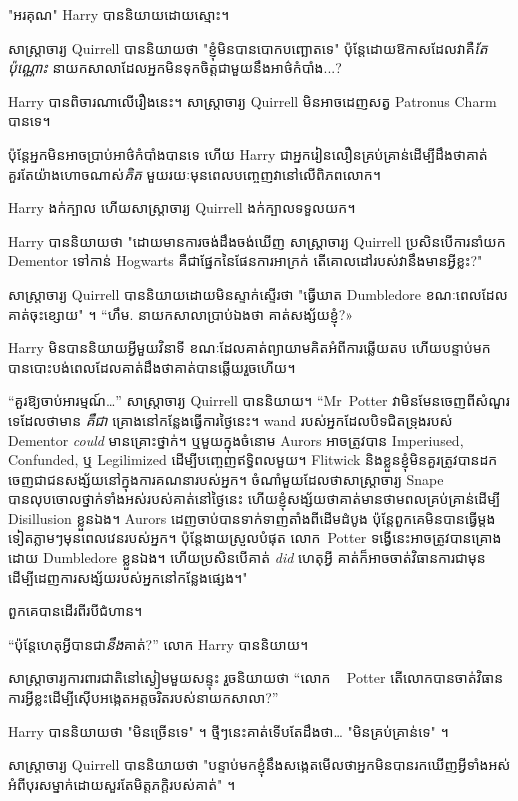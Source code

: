{"អរគុណ" Harry បាននិយាយដោយស្មោះ។

សាស្រ្តាចារ្យ Quirrell បាននិយាយថា "ខ្ញុំមិនបានបោកបញ្ឆោតទេ" ប៉ុន្តែដោយឱកាសដែលវាគឺ\emph{តែប៉ុណ្ណោះ} នាយកសាលាដែលអ្នកមិនទុកចិត្តជាមួយនឹងអាថ៌កំបាំង...?

Harry បានពិចារណាលើរឿងនេះ។ សាស្រ្តាចារ្យ Quirrell មិនអាចដេញសត្វ Patronus Charm បានទេ។

ប៉ុន្តែអ្នកមិនអាចប្រាប់អាថ៌កំបាំងបានទេ ហើយ Harry ជាអ្នករៀនលឿនគ្រប់គ្រាន់ដើម្បីដឹងថាគាត់គួរតែយ៉ាងហោចណាស់\emph{គិត} មួយរយៈមុនពេលបញ្ចេញវានៅលើពិភពលោក។

Harry ងក់ក្បាល ហើយសាស្រ្តាចារ្យ Quirrell ងក់ក្បាលទទួលយក។

Harry បាននិយាយថា "ដោយមានការចង់ដឹងចង់ឃើញ សាស្រ្តាចារ្យ Quirrell ប្រសិនបើការនាំយក Dementor ទៅកាន់ Hogwarts គឺជាផ្នែកនៃផែនការអាក្រក់ តើគោលដៅរបស់វានឹងមានអ្វីខ្លះ?"

សាស្ត្រាចារ្យ Quirrell បាននិយាយដោយមិនស្ទាក់ស្ទើរថា "ធ្វើឃាត Dumbledore ខណៈពេលដែលគាត់ចុះខ្សោយ" ។ “ហឹម. នាយក​សាលា​ប្រាប់​ឯង​ថា គាត់​សង្ស័យ​ខ្ញុំ?»

Harry មិន​បាន​និយាយ​អ្វី​មួយ​វិនាទី ខណៈ​ដែល​គាត់​ព្យាយាម​គិត​អំពី​ការ​ឆ្លើយតប ហើយ​បន្ទាប់​មក​បាន​បោះបង់​ពេល​ដែល​គាត់​ដឹង​ថា​គាត់​បាន​ឆ្លើយ​រួច​ហើយ។

“គួរឱ្យចាប់អារម្មណ៍…” សាស្ត្រាចារ្យ Quirrell បាននិយាយ។ “Mr~Potter វាមិនមែនចេញពីសំណួរទេដែលថាមាន \emph{គឺជា} គ្រោងនៅកន្លែងធ្វើការថ្ងៃនេះ។ wand របស់អ្នកដែលបិទជិតទ្រុងរបស់ Dementor \emph{could} មានគ្រោះថ្នាក់។ ឬមួយក្នុងចំនោម Aurors អាចត្រូវបាន Imperiused, Confunded, ឬ Legilimized ដើម្បីបញ្ចេញឥទ្ធិពលមួយ។ Flitwick និងខ្លួនខ្ញុំមិនគួរត្រូវបានដកចេញជាជនសង្ស័យនៅក្នុងការគណនារបស់អ្នក។ ចំណាំមួយដែលថាសាស្រ្តាចារ្យ Snape បានលុបចោលថ្នាក់ទាំងអស់របស់គាត់នៅថ្ងៃនេះ ហើយខ្ញុំសង្ស័យថាគាត់មានថាមពលគ្រប់គ្រាន់ដើម្បី Disillusion ខ្លួនឯង។ Aurors ដេញចាប់បានទាក់ទាញតាំងពីដើមដំបូង ប៉ុន្តែពួកគេមិនបានធ្វើម្តងទៀតភ្លាមៗមុនពេលវេនរបស់អ្នក។ ប៉ុន្តែងាយស្រួលបំផុត លោក~Potter ទង្វើនេះអាចត្រូវបានគ្រោងដោយ Dumbledore ខ្លួនឯង។ ហើយប្រសិនបើគាត់ \emph{did} ហេតុអ្វី គាត់ក៏អាចចាត់វិធានការជាមុន ដើម្បីដេញការសង្ស័យរបស់អ្នកនៅកន្លែងផ្សេង។"

ពួកគេបានដើរពីរបីជំហាន។

“ប៉ុន្តែហេតុអ្វីបានជា\emph{នឹង}គាត់?” លោក Harry បាននិយាយ។

សាស្ត្រាចារ្យ​ការពារ​ជាតិ​នៅ​ស្ងៀម​មួយ​សន្ទុះ រួច​និយាយ​ថា “លោក ~ Potter តើ​លោក​បាន​ចាត់​វិធានការ​អ្វី​ខ្លះ​ដើម្បី​ស៊ើប​អង្កេត​អត្តចរិត​របស់​នាយក​សាលា?”

Harry បាននិយាយថា "មិនច្រើនទេ" ។ ថ្មីៗនេះគាត់ទើបតែដឹងថា… "មិនគ្រប់គ្រាន់ទេ" ។

សាស្រ្តាចារ្យ Quirrell បាននិយាយថា "បន្ទាប់មកខ្ញុំនឹងសង្កេតមើលថាអ្នកមិនបានរកឃើញអ្វីទាំងអស់អំពីបុរសម្នាក់ដោយសួរតែមិត្តភក្តិរបស់គាត់" ។

}
